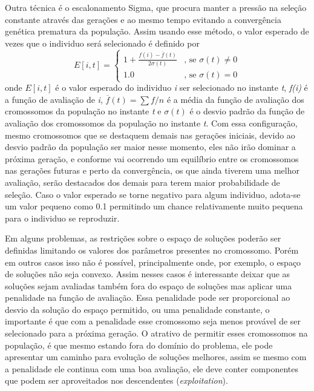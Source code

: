 Outra técnica é o escalonamento Sigma, que procura manter a pressão na seleção constante através das gerações e ao mesmo tempo evitando a convergência genética prematura da população. Assim usando esse método, o valor esperado de vezes que o individuo será selecionado é definido por 
\begin{equation*}
E[i,t] = \left \lbrace  \begin{array}{cc} 1 + \frac{f(i) - \overline{f}(t)}{2\sigma(t)} & \text{, se } \sigma(t) \neq 0 \\
					1.0 & \text{, se } \sigma(t) = 0  \end{array}  \right.
\end{equation*}
onde \(E[i,t]\) é o valor esperado do individuo \textit{i} ser selecionado no instante \textit{t}, \textit{f(i)} é a função de avaliação de \textit{i}, \(\overline{f}(t) = \sum{f}/n\) é a média da função de avaliação dos cromossomos da população no instante \textit{t} e \(\sigma(t)\) é o desvio padrão da função de avaliação dos cromossomos da população no instante \textit{t}. Com essa configuração, mesmo cromossomos que se destaquem demais nas gerações iniciais, devido ao desvio padrão da população ser maior nesse momento, eles não irão dominar a próxima geração, e conforme vai ocorrendo um equilíbrio entre os cromossomos nas gerações futuras e perto da convergência, os que ainda tiverem uma melhor avaliação, serão destacados dos demais para terem maior probabilidade de seleção. Caso o valor esperado se torne negativo para algum individuo, adota-se um valor pequeno como 0.1 permitindo um chance relativamente muito pequena para o individuo se reproduzir. \cite{Mitchell1996}

Em alguns problemas, as restrições sobre o espaço de soluções poderão ser definidas limitando os valores dos parâmetros presentes no cromossomo. Porém em outros casos isso não é possível, principalmente onde, por exemplo, o espaço de soluções não seja convexo. Assim nesses casos é interessante deixar que as soluções sejam avaliadas também fora do espaço de soluções mas aplicar uma penalidade na função de avaliação. Essa penalidade pode ser proporcional ao desvio da solução do espaço permitido, ou uma penalidade constante, o importante é que com a penalidade esse cromossomo seja menos provável de ser selecionado para a próxima geração. O atrativo de permitir esses cromossomos na população, é que mesmo estando fora do domínio do problema, ele pode apresentar um caminho para evolução de soluções melhores, assim se mesmo com a penalidade ele continua com uma boa avaliação, ele deve conter componentes que podem ser aproveitados nos descendentes (\textit{exploitation}).

